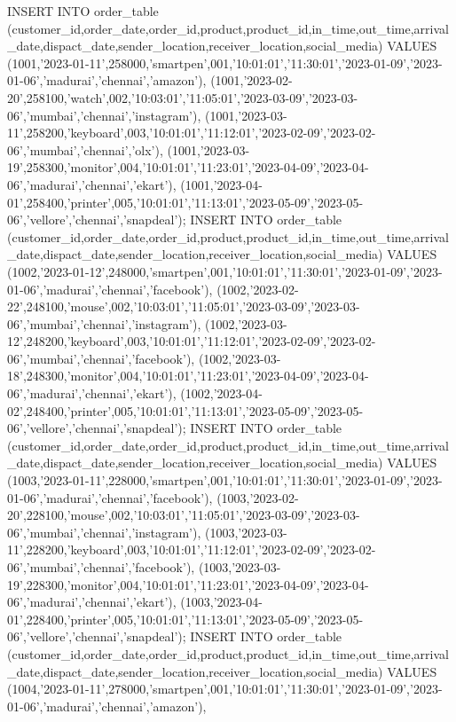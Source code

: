  INSERT INTO order_table
(customer_id,order_date,order_id,product,product_id,in_time,out_time,arrival_date,dispact_date,sender_location,receiver_location,social_media) VALUES
(1001,'2023-01-11',258000,'smartpen',001,'10:01:01','11:30:01','2023-01-09','2023-01-06','madurai','chennai','amazon'),
(1001,'2023-02-20',258100,'watch',002,'10:03:01','11:05:01','2023-03-09','2023-03-06','mumbai','chennai','instagram'),
(1001,'2023-03-11',258200,'keyboard',003,'10:01:01','11:12:01','2023-02-09','2023-02-06','mumbai','chennai','olx'),
(1001,'2023-03-19',258300,'monitor',004,'10:01:01','11:23:01','2023-04-09','2023-04-06','madurai','chennai','ekart'),
(1001,'2023-04-01',258400,'printer',005,'10:01:01','11:13:01','2023-05-09','2023-05-06','vellore','chennai','snapdeal');
INSERT INTO order_table
(customer_id,order_date,order_id,product,product_id,in_time,out_time,arrival_date,dispact_date,sender_location,receiver_location,social_media) VALUES
(1002,'2023-01-12',248000,'smartpen',001,'10:01:01','11:30:01','2023-01-09','2023-01-06','madurai','chennai','facebook'),
(1002,'2023-02-22',248100,'mouse',002,'10:03:01','11:05:01','2023-03-09','2023-03-06','mumbai','chennai','instagram'),
(1002,'2023-03-12',248200,'keyboard',003,'10:01:01','11:12:01','2023-02-09','2023-02-06','mumbai','chennai','facebook'),
(1002,'2023-03-18',248300,'monitor',004,'10:01:01','11:23:01','2023-04-09','2023-04-06','madurai','chennai','ekart'),
(1002,'2023-04-02',248400,'printer',005,'10:01:01','11:13:01','2023-05-09','2023-05-06','vellore','chennai','snapdeal');
INSERT INTO order_table
(customer_id,order_date,order_id,product,product_id,in_time,out_time,arrival_date,dispact_date,sender_location,receiver_location,social_media) VALUES
(1003,'2023-01-11',228000,'smartpen',001,'10:01:01','11:30:01','2023-01-09','2023-01-06','madurai','chennai','facebook'),
(1003,'2023-02-20',228100,'mouse',002,'10:03:01','11:05:01','2023-03-09','2023-03-06','mumbai','chennai','instagram'),
(1003,'2023-03-11',228200,'keyboard',003,'10:01:01','11:12:01','2023-02-09','2023-02-06','mumbai','chennai','facebook'),
(1003,'2023-03-19',228300,'monitor',004,'10:01:01','11:23:01','2023-04-09','2023-04-06','madurai','chennai','ekart'),
(1003,'2023-04-01',228400,'printer',005,'10:01:01','11:13:01','2023-05-09','2023-05-06','vellore','chennai','snapdeal');
INSERT INTO order_table
(customer_id,order_date,order_id,product,product_id,in_time,out_time,arrival_date,dispact_date,sender_location,receiver_location,social_media) VALUES
(1004,'2023-01-11',278000,'smartpen',001,'10:01:01','11:30:01','2023-01-09','2023-01-06','madurai','chennai','amazon'),
